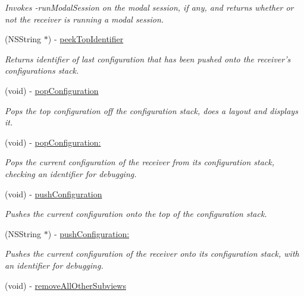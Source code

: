 \begin{CompactItemize}
\begin{CompactList}\small\item\em Invokes -runModalSession on the modal session, if any, and returns whether or not the receiver is running a modal session. \item\end{CompactList}\item 
(NSString $\ast$) - \hyperlink{interface_s_s_y_alert_c88faf997cadf44f5193db9d1c10a79f}{peekTopIdentifier}
\begin{CompactList}\small\item\em Returns identifier of last configuration that has been pushed onto the receiver's configurations stack. \item\end{CompactList}\item 
(void) - \hyperlink{interface_s_s_y_alert_f945f585830f7d0573e7bbc96749e935}{popConfiguration}
\begin{CompactList}\small\item\em Pops the top configuration off the configuration stack, does a layout and displays it. \item\end{CompactList}\item 
(void) - \hyperlink{interface_s_s_y_alert_5d8ab50f128a7b29cdf85c9b7290814e}{popConfiguration:}
\begin{CompactList}\small\item\em Pops the current configuration of the receiver from its configuration stack, checking an identifier for debugging. \item\end{CompactList}\item 
(void) - \hyperlink{interface_s_s_y_alert_438a6ebc533213f49238105d8bad07bd}{pushConfiguration}
\begin{CompactList}\small\item\em Pushes the current configuration onto the top of the configuration stack. \item\end{CompactList}\item 
(NSString $\ast$) - \hyperlink{interface_s_s_y_alert_f251640252cc9f568b5622c1a74e62ed}{pushConfiguration:}
\begin{CompactList}\small\item\em Pushes the current configuration of the receiver onto its configuration stack, with an identifier for debugging. \item\end{CompactList}\item 
\hypertarget{interface_s_s_y_alert_ffe4751f583a28d359d1911e0d05c1b9}{
(void) - \hyperlink{interface_s_s_y_alert_ffe4751f583a28d359d1911e0d05c1b9}{removeAllOtherSubviews}}
\label{interface_s_s_y_alert_ffe4751f583a28d359d1911e0d05c1b9}


\end{CompactItemize}
